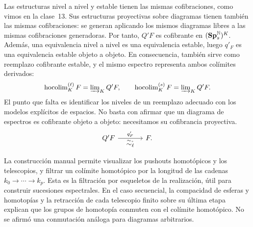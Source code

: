 Las estructuras nivel a nivel y estable tienen las mismas cofibraciones, como vimos en la clase~13. Sus estructuras proyectivas sobre diagramas tienen también las mismas cofibraciones: se generan aplicando los mismos diagramas libres a las mismas cofibraciones generadoras. Por tanto, $Q'F$ es cofibrante en $(\mathbf{Sp}^{\mathbb N}_s)^K$. Además, una equivalencia nivel a nivel es una equivalencia estable, luego $q'_F$ es una equivalencia estable objeto a objeto. En consecuencia, también sirve como reemplazo cofibrante estable, y el mismo espectro representa ambos colímites derivados:
\[
\operatorname{hocolim}^{(\ell)}_KF=\varinjlim\nolimits_KQ'F,
\qquad
\operatorname{hocolim}^{(s)}_KF=\varinjlim\nolimits_KQ'F.
\]
El punto que falta es identificar los niveles de un reemplazo adecuado con los modelos explícitos de espacios. No basta con afirmar que un diagrama de espectros es cofibrante objeto a objeto: necesitamos su cofibrancia proyectiva.
\[
\begin{tikzcd}[column sep=large]
Q'F \arrow[r,"q'_F","\sim_s"',shift left=0] \arrow[r,phantom,"\sim_\ell" description,yshift=-10pt] & F.
\end{tikzcd}
\]

\begin{obs}
La construcción manual permite visualizar los pushouts homotópicos y los telescopios, y filtrar un colímite homotópico por la longitud de las cadenas $k_0\to\cdots\to k_p$. Esta es la filtración por esqueletos de la realización, útil para construir sucesiones espectrales. En el caso secuencial, la compacidad de esferas y homotopías y la retracción de cada telescopio finito sobre su última etapa explican que los grupos de homotopía conmuten con el colímite homotópico. No se afirmó una conmutación análoga para diagramas arbitrarios.
\end{obs}